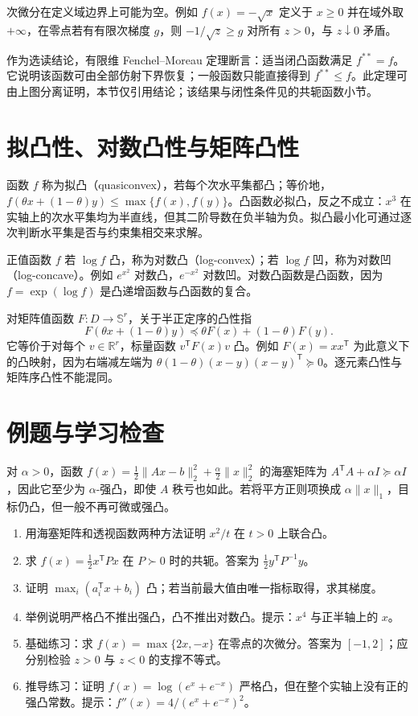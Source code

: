 \documentclass[UTF8,12pt,a4paper,fontset=fandol]{ctexbook}
\begin{document}
次微分在定义域边界上可能为空。例如 $f(x)=-\sqrt{x}$ 定义于 $x\geq0$ 并在域外取 $+\infty$，在零点若有有限次梯度 $g$，则 $-1/\sqrt z\geq g$ 对所有 $z>0$，与 $z\downarrow0$ 矛盾。

作为选读结论，有限维 Fenchel--Moreau 定理断言：适当闭凸函数满足 $f^{**}=f$。它说明该函数可由全部仿射下界恢复；一般函数只能直接得到 $f^{**}\leq f$。此定理可由上图分离证明，本节仅引用结论；该结果与闭性条件见\cite{boyd-vandenberghe}的共轭函数小节。

\section{拟凸性、对数凸性与矩阵凸性}

函数 $f$ 称为拟凸（quasiconvex），若每个次水平集都凸；等价地，$f(\theta x+(1-\theta)y)\leq\max\{f(x),f(y)\}$。凸函数必拟凸，反之不成立：$x^3$ 在实轴上的次水平集均为半直线，但其二阶导数在负半轴为负。拟凸最小化可通过逐次判断水平集是否与约束集相交来求解。

正值函数 $f$ 若 $\log f$ 凸，称为对数凸（log-convex）；若 $\log f$ 凹，称为对数凹（log-concave）。例如 $e^{x^2}$ 对数凸，$e^{-x^2}$ 对数凹。对数凸函数是凸函数，因为 $f=\exp(\log f)$ 是凸递增函数与凸函数的复合。

对矩阵值函数 $F:D\to\mathbb S^r$，关于半正定序的凸性指
\[
 F(\theta x+(1-\theta)y)\preceq\theta F(x)+(1-\theta)F(y).
\]
它等价于对每个 $v\in\mathbb R^r$，标量函数 $v^{\mathsf T}F(x)v$ 凸。例如 $F(x)=xx^{\mathsf T}$ 为此意义下的凸映射，因为右端减左端为 $\theta(1-\theta)(x-y)(x-y)^{\mathsf T}\succeq0$。逐元素凸性与矩阵序凸性不能混同。

\section{例题与学习检查}
\begin{example}[曲率与正则化]
对 $\alpha>0$，函数 $f(x)=\tfrac12\|Ax-b\|_2^2+\tfrac\alpha2\|x\|_2^2$ 的海塞矩阵为 $A^{\mathsf T}A+\alpha I\succeq\alpha I$，因此它至少为 $\alpha$-强凸，即使 $A$ 秩亏也如此。若将平方正则项换成 $\alpha\|x\|_1$，目标仍凸，但一般不再可微或强凸。
\end{example}
\begin{enumerate}
 \item 用海塞矩阵和透视函数两种方法证明 $x^2/t$ 在 $t>0$ 上联合凸。
 \item 求 $f(x)=\tfrac12x^{\mathsf T}Px$ 在 $P\succ0$ 时的共轭。答案为 $\tfrac12y^{\mathsf T}P^{-1}y$。
 \item 证明 $\max_i(a_i^{\mathsf T}x+b_i)$ 凸；若当前最大值由唯一指标取得，求其梯度。
 \item 举例说明严格凸不推出强凸，凸不推出对数凸。提示：$x^4$ 与正半轴上的 $x$。
 \item 基础练习：求 $f(x)=\max\{2x,-x\}$ 在零点的次微分。答案为 $[-1,2]$；应分别检验 $z>0$ 与 $z<0$ 的支撑不等式。
 \item 推导练习：证明 $f(x)=\log(e^x+e^{-x})$ 严格凸，但在整个实轴上没有正的强凸常数。提示：$f''(x)=4/(e^x+e^{-x})^2$。
\end{enumerate}
\end{document}
